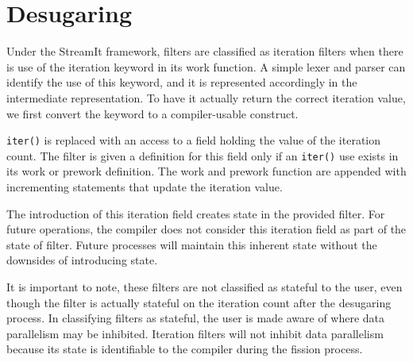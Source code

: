 \section{Desugaring}
\label{sec:desugar}

%
%
%
%
%
%
%
%
%
%

%


Under the StreamIt framework, filters are classified as iteration filters when there is use of the iteration keyword in its work function.  A simple lexer and parser can identify the use of this keyword, and it is represented accordingly in the intermediate representation.  To have it actually return the correct iteration value, we first convert the keyword to a compiler-usable construct.

{\tt iter()} is replaced with an access to a field holding the value of the iteration count.  The filter is given a definition for this field only if an {\tt iter()} use exists in its work or prework definition.  The work and prework function are appended with incrementing statements that update the iteration value.

The introduction of this iteration field creates state in the provided filter.  For future operations, the compiler does not consider this iteration field as part of the state of filter.  Future processes will maintain this inherent state without the downsides of introducing state.

It is important to note, these filters are not classified as stateful to the user, even though the filter is actually stateful on the iteration count after the desugaring process.  In classifying filters as stateful, the user is made aware of where data parallelism may be inhibited.  Iteration filters will not inhibit data parallelism because its state is identifiable to the compiler during the fission process.   

